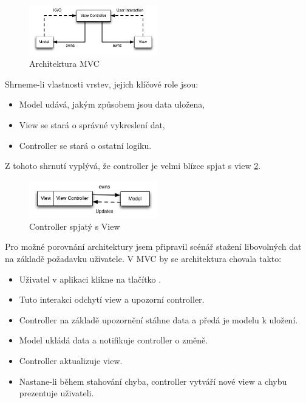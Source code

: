 \begin{figure}\centering
	\includegraphics[width=0.5\textwidth]{assets/mvc-architecture.png}
	\caption[Architektura MVC]{Architektura MVC}\label{architecture-mvc}
\end{figure}


Shrneme-li vlastnosti vrstev, jejich klíčové role jsou:


\begin{itemize}
  \item Model udává, jakým způsobem jsou data uložena,
  \item View se stará o správné vykreslení dat,
  \item Controller se stará o ostatní logiku.
\end{itemize}

Z tohoto shrnutí vyplývá, že controller je velmi blízce spjat s view \ref{massive-mvc}.

\begin{figure}\centering
	\includegraphics[width=0.5\textwidth]{assets/mvc-massive-view-controller.png}
	\caption[Role Controlleru v MVC]{Controller spjatý s View}\label{massive-mvc}
\end{figure}

Pro možné porovnání architektury jsem připravil scénář stažení libovolných dat na základě požadavku uživatele.
V MVC by se architektura chovala takto:

\begin{itemize}
  \item Uživatel v aplikaci klikne na tlačítko .
  \item Tuto interakci odchytí view a upozorní controller.
  \item Controller na základě upozornění stáhne data a předá je modelu k uložení.
  \item Model ukládá data a notifikuje controller o změně.
  \item Controller aktualizuje view.
  \item Nastane-li během stahování chyba, controller vytváří nové view a chybu prezentuje uživateli.
\end{itemize}

